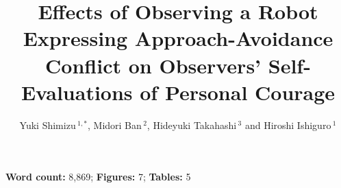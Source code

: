 \documentclass[utf8]{FrontiersinHarvard}
\def\firstAuthorLast{Shimizu {et~al.}}
\def\Authors{Yuki Shimizu\,$^{1,*}$, Midori Ban\,$^{2}$, Hideyuki Takahashi\,$^{3}$ and Hiroshi Ishiguro\,$^{1}$}
\begin{document}
\onecolumn
{}

\title[Robot-expressed approach-avoidance conflict]{Effects of Observing a Robot Expressing Approach-Avoidance Conflict on Observers' Self-Evaluations of Personal Courage}

\author[\firstAuthorLast ]{\Authors}
\address{}
\correspondance{}
\extraAuth{}

\maketitle

\begin{flushleft}
\small
\textbf{Word count:} 8,869; \textbf{Figures:} 7; \textbf{Tables:} 5
\end{flushleft}
\vspace{0.5em}
\end{document}
